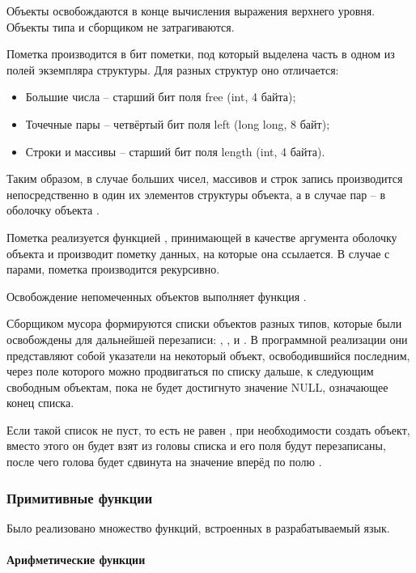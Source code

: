 Объекты освобождаются в конце вычисления выражения верхнего уровня. Объекты типа  и  сборщиком не затрагиваются.

Пометка производится в бит пометки, под который выделена часть в одном из полей экземпляра структуры. Для разных структур оно отличается:
\begin{itemize}
	\item Большие числа -- старший бит поля free (int, 4 байта);
	\item Точечные пары -- четвёртый бит поля left (long long, 8 байт);
	\item Строки и массивы -- старший бит поля length (int, 4 байта).
\end{itemize}

Таким образом, в случае больших чисел, массивов и строк запись производится непосредственно в один их элементов структуры объекта, а в случае пар -- в оболочку объекта .

Пометка реализуется функцией , принимающей в качестве аргумента оболочку объекта и производит пометку данных, на которые она ссылается. В случае с парами, пометка производится рекурсивно.

Освобождение непомеченных объектов выполняет функция .

Сборщиком мусора формируются списки объектов разных типов, которые были освобождены для дальнейшей перезаписи: , ,  и . В программной реализации они представляют собой указатели на некоторый объект, освободившийся последним, через поле  которого можно продвигаться по списку дальше, к следующим свободным объектам, пока не будет достигнуто значение NULL, означающее конец списка.

Если такой список не пуст, то есть не равен , при необходимости создать объект, вместо этого он будет взят из головы списка и его поля будут перезаписаны, после чего голова будет сдвинута на значение вперёд по полю .



\subsubsection{Примитивные функции}

Было реализовано множество функций, встроенных в разрабатываемый язык.

\paragraph{Арифметические функции}


